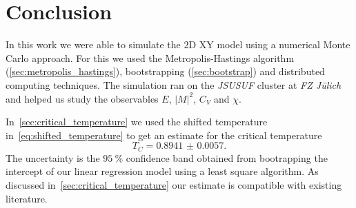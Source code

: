 \section{Conclusion}
In this work we were able to simulate the $2$D XY model using a numerical Monte Carlo approach. For this we used the Metropolis-Hastings algorithm (\cref{sec:metropolis_hastings}), bootstrapping (\cref{sec:bootstrap}) and distributed computing techniques. The simulation ran on the \emph{JSUSUF} cluster at \emph{FZ Jülich} and helped us study the observables $E$, ${\lvert M \rvert}^2$, $C_V$ and $\chi$.

In~\cref{sec:critical_temperature} we used the shifted temperature  in~\cref{eq:shifted_temperature} to get an estimate for the critical temperature
\begin{equation}
	T_C = \num{0.8941(57)}.
\end{equation}
The uncertainty is the $\SI{95}{\percent}$ confidence band obtained from bootrapping the intercept of our linear regression model using a least square algorithm. As discussed in~\cref{sec:critical_temperature} our estimate is compatible with existing literature.